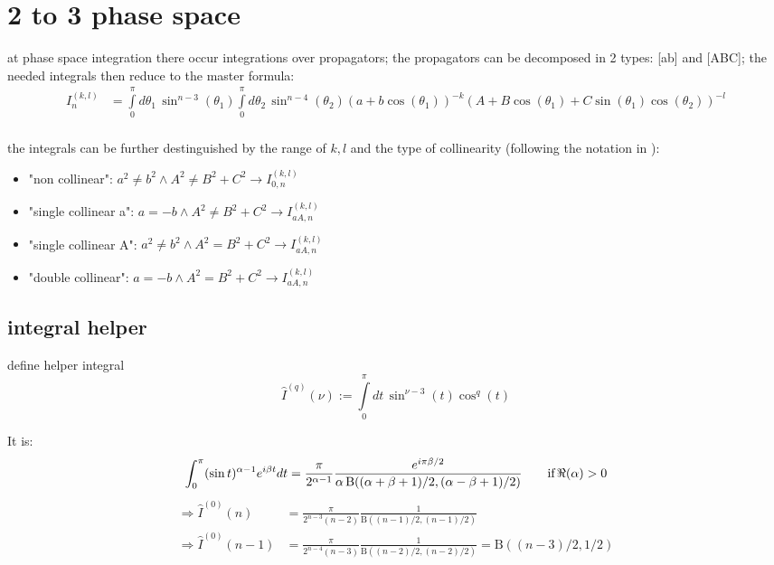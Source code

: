 \documentclass[
  english,		%
  a4paper,		%
  11pt,			%
  DIV=12,
  titlepage,
  toc=bibnumbered,
  parskip=full,  	%
  headings=normal,
  BCOR=12mm,
  numbers=noenddot
]{scrartcl}
\begin{document}
\section{2 to 3 phase space}
at phase space integration there occur integrations over propagators\cite{Bojak:2000eu,PhysRevD.40.54,van_neerven_dimensional_1986}; the propagators can be decomposed in 2 types: [ab] and [ABC]; the needed integrals then reduce to the master formula:
\begin{align}
I_n^{(k,l)} &=\int\limits_0^\pi\!d\theta_1\,\sin^{n-3}(\theta_1)\int\limits_0^\pi\!d\theta_2\,\sin^{n-4}(\theta_2)(a+b\cos(\theta_1))^{-k}(A+B\cos(\theta_1)+C\sin(\theta_1)\cos(\theta_2))^{-l}\\
\end{align}

the integrals can be further destinguished by the range of $k,l$ and the type of collinearity (following the notation in \cite{Bojak:2000eu}):
\begin{itemize}
\item "non collinear": $a^2\neq b^2 \land A^2 \neq B^2 + C^2 \rightarrow I_{0,n}^{(k,l)}$
\item "single collinear a": $a=-b \land A^2 \neq B^2 + C^2 \rightarrow I_{aA,n}^{(k,l)}$
\item "single collinear A": $a^2\neq b^2 \land A^2 = B^2 + C^2 \rightarrow I_{aA,n}^{(k,l)}$
\item "double collinear": $a=-b \land A^2 = B^2 + C^2 \rightarrow I_{aA,n}^{(k,l)}$
\end{itemize}


\subsection{integral helper}
define helper integral
\begin{equation}
\hat I^{(q)}(\nu) := \int\limits_0^\pi\!dt\,\sin^{\nu-3}(t)\cos^{q}(t)
\end{equation}

It is\cite[eq. 5.12.6]{NIST:DLMF}:
\begin{equation}
\int_{0}^{\pi}(\mathop{\sin\/}\nolimits t)^{\alpha-1}e^{i\beta t}dt=\frac{\pi}{2^{\alpha-1}} \frac{e^{i\pi \beta/2}}{\alpha\mathop{\mathrm{B}\/}\nolimits\!\left((\alpha+\beta+1)/2,(\alpha-\beta+1)/2\right)} \qquad\text{if}\,\Re(\alpha) > 0
\end{equation}
\begin{align}
\Rightarrow \hat I^{(0)}(n) &= \frac{\pi}{2^{n-3}(n-2)}\frac 1 {\mathrm{B}((n-1)/2,(n-1)/2)}\\
\Rightarrow \hat I^{(0)}(n-1) &= \frac{\pi}{2^{n-4}(n-3)}\frac 1 {\mathrm{B}((n-2)/2,(n-2)/2)}=\mathrm{B}((n-3)/2,1/2)
\end{align}
\end{document}
